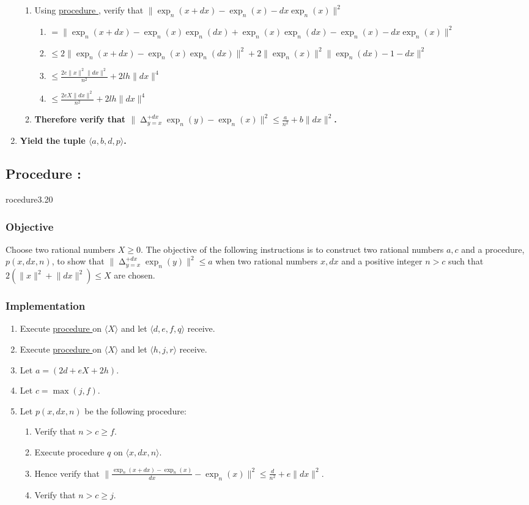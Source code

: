 \documentclass{article}
\DeclareMathOperator*{\diff}{\Delta}
\newcounter{procedure}[part]
\newcommand{\procedure}[1]{\subsection*{Procedure \thepart:\theprocedure}\label{sec:procedure #1}\global\expandafter\edef\csname procedure#1\endcsname{\thepart:\theprocedure}\addtocounter{procedure}{1}}
\newcommand{\objective}{\subsubsection*{Objective}}
\newcommand{\implementation}{\subsubsection*{Implementation}}
\newcommand{\procedurehr}[1]{\hyperref[sec:procedure #1]{procedure \expandafter\csname procedure#1\endcsname}}
\begin{document}
\begin{multicols}{2}
\begin{enumerate}
\begin{enumerate}
						\item Using \procedurehr{3.04}, verify that $\lVert\exp_n(x+dx)-\exp_n(x)-dx\exp_n(x)\rVert^2$
						\begin{enumerate}
							\item $=\lVert\exp_n(x+dx)-\exp_n(x)\exp_n(dx)+\exp_n(x)\exp_n(dx)-\exp_n(x)-dx\exp_n(x)\rVert^2$
							\item $\le 2\lVert\exp_n(x+dx)-\exp_n(x)\exp_n(dx)\rVert^2+2\lVert\exp_n(x)\rVert^2\lVert\exp_n(dx)-1-dx\rVert^2$
							\item $\le\frac{2e\lVert x\rVert^2\lVert dx\rVert^2}{n^2}+2lh\lVert dx\rVert^4$
							\item $\le\frac{2eX\lVert dx\rVert^2}{n^2}+2lh\lVert dx\rVert^4$
						\end{enumerate}
						\item \textbf{Therefore verify that $\lVert\diff_{y=x}^{+dx}\exp_n(y)-\exp_n(x)\rVert^2\le\frac{a}{n^2}+b\lVert dx\rVert^2$.}
					\end{enumerate}
					\item \textbf{Yield the tuple $\langle a,b,d,p\rangle$.}
				\end{enumerate}
		\procedure{3.20}
			\objective
				Choose two rational numbers $X\ge 0$. The objective of the following instructions is to construct two rational numbers $a,c$ and a procedure, $p(x,dx,n)$, to show that $\lVert\diff_{y=x}^{+dx}\exp_n(y)\rVert^2\le a$ when two rational numbers $x,dx$ and a positive integer $n>c$ such that $2(\lVert x\rVert^2+\lVert dx\rVert^2)\le X$ are chosen.
			\implementation
				\begin{enumerate}
					\item Execute \procedurehr{3.19} on $\langle X\rangle$ and let $\langle d,e,f,q\rangle$ receive.
					\item Execute \procedurehr{3.13} on $\langle X\rangle$ and let $\langle h,j,r\rangle$ receive.
					\item Let $a=(2d+eX+2h)$.
					\item Let $c=\max(j,f)$.
					\item Let $p(x,dx,n)$ be the following procedure:
					\begin{enumerate}
						\item Verify that $n>c\ge f$.
						\item Execute procedure $q$ on $\langle x,dx,n\rangle$.
						\item Hence verify that $\lVert\frac{\exp_n(x+dx)-\exp_n(x)}{dx}-\exp_n(x)\rVert^2\le\frac{d}{n^2}+e\lVert dx\rVert^2$.
						\item Verify that $n>c\ge j$.

\end{enumerate}
\end{enumerate}
\end{multicols}
\end{document}
